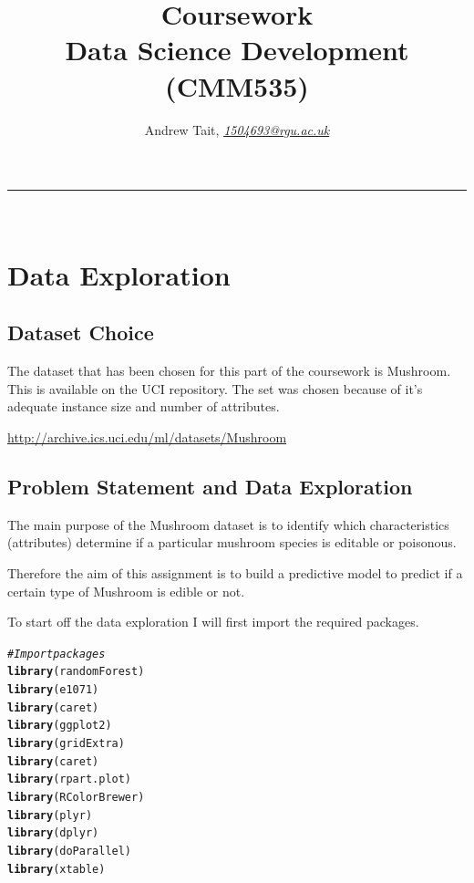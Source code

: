 \documentclass[10pt  ,usenames, dvipsnames]{article}\usepackage[]{graphicx}\usepackage[]{color}
\makeatletter
\newcommand{\hlcom}[1]{\textcolor[rgb]{0.678,0.584,0.686}{\textit{#1}}}%
\newcommand{\hlstd}[1]{\textcolor[rgb]{0.345,0.345,0.345}{#1}}%
\newcommand{\hlkwd}[1]{\textcolor[rgb]{0.737,0.353,0.396}{\textbf{#1}}}%
\newenvironment{kframe}{%
 \def\at@end@of@kframe{}%
 \ifinner\ifhmode%
  \def\at@end@of@kframe{\end{minipage}}%
  \begin{minipage}{\columnwidth}%
 \fi\fi%
 \def\FrameCommand##1{\hskip\@totalleftmargin \hskip-\fboxsep
 \colorbox{shadecolor}{##1}\hskip-\fboxsep
     \hskip-\linewidth \hskip-\@totalleftmargin \hskip\columnwidth}%
 \MakeFramed {\advance\hsize-\width
   \@totalleftmargin\z@ \linewidth\hsize
   \@setminipage}}%
 {\par\unskip\endMakeFramed%
 \at@end@of@kframe}
\newenvironment{knitrout}{}{} %
\makeatother
\begin{document}
\title{\LARGE Coursework  \\ Data Science Development (CMM535)}

\author{Andrew Tait, \textit{\href{1504693@rgu.ac.uk}{1504693@rgu.ac.uk}}}
\maketitle
\noindent\rule{16cm}{0.4pt}
\ \\



\section {Data Exploration}



\subsection{Dataset Choice}
The dataset that has been chosen for this part of the coursework is Mushroom. This is available on the UCI repository. The set was chosen because of it's adequate instance size and number of attributes.

\url{http://archive.ics.uci.edu/ml/datasets/Mushroom}



\subsection{Problem Statement and Data Exploration}


The main purpose of the Mushroom dataset is to identify which characteristics (attributes) determine if a particular mushroom species is editable or poisonous.

Therefore the aim of this assignment is to build a predictive model to predict if a certain type of Mushroom is edible or not.


To start off the data exploration I will first import the required packages.

\begin{knitrout}
\color{fgcolor}\begin{kframe}
\begin{alltt}
\hlcom{#Import packages}
\hlkwd{library}\hlstd{(randomForest)}
\hlkwd{library}\hlstd{(e1071)}
\hlkwd{library}\hlstd{(caret)}
\hlkwd{library}\hlstd{(ggplot2)}
\hlkwd{library}\hlstd{(gridExtra)}
\hlkwd{library}\hlstd{(caret)}
\hlkwd{library}\hlstd{(rpart.plot)}
\hlkwd{library}\hlstd{(RColorBrewer)}
\hlkwd{library}\hlstd{(plyr)}
\hlkwd{library}\hlstd{(dplyr)}
\hlkwd{library}\hlstd{(doParallel)}
\hlkwd{library}\hlstd{(xtable)}
\end{alltt}
\end{kframe}
\end{knitrout}
\end{document}

